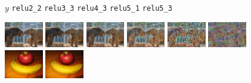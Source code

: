 \documentclass[runningheads]{llncs}
\begin{document}
\begin{figure}[t]
  \hspace{10.5mm} $y$
  \hspace{10mm} \verb|relu2_2|
  \hspace{5.5mm} \verb|relu3_3|
  \hspace{5.5mm} \verb|relu4_3|
  \hspace{5.5mm} \verb|relu5_1|
  \hspace{5.5mm} \verb|relu5_3|
  \vspace{-2mm}
  \begin{center}
    \includegraphics[width=0.15\textwidth]{elephant_small.jpg}
    \includegraphics[width=0.15\textwidth]{elephant_9.jpg}
    \includegraphics[width=0.15\textwidth]{elephant_16.jpg}
    \includegraphics[width=0.15\textwidth]{elephant_23.jpg}
    \includegraphics[width=0.15\textwidth]{elephant_26.jpg}
    \includegraphics[width=0.15\textwidth]{elephant_30.jpg} \\
    \includegraphics[width=0.15\textwidth]{fruit_small.jpg}
    \includegraphics[width=0.15\textwidth]{fruit_9.jpg}

\end{center}
\end{figure}
\end{document}

